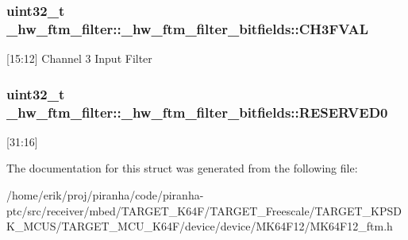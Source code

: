 \subsubsection[{\texorpdfstring{C\+H3\+F\+V\+AL}{CH3FVAL}}]{\setlength{\rightskip}{0pt plus 5cm}uint32\+\_\+t \+\_\+hw\+\_\+ftm\+\_\+filter\+::\+\_\+hw\+\_\+ftm\+\_\+filter\+\_\+bitfields\+::\+C\+H3\+F\+V\+AL}\hypertarget{struct__hw__ftm__filter_1_1__hw__ftm__filter__bitfields_a79fa7480881c915bbac33194cc05620d}{}\label{struct__hw__ftm__filter_1_1__hw__ftm__filter__bitfields_a79fa7480881c915bbac33194cc05620d}
\mbox{[}15\+:12\mbox{]} Channel 3 Input Filter 
\subsubsection[{\texorpdfstring{R\+E\+S\+E\+R\+V\+E\+D0}{RESERVED0}}]{\setlength{\rightskip}{0pt plus 5cm}uint32\+\_\+t \+\_\+hw\+\_\+ftm\+\_\+filter\+::\+\_\+hw\+\_\+ftm\+\_\+filter\+\_\+bitfields\+::\+R\+E\+S\+E\+R\+V\+E\+D0}\hypertarget{struct__hw__ftm__filter_1_1__hw__ftm__filter__bitfields_a7301508d7bc934b91346f6df87dd9da0}{}\label{struct__hw__ftm__filter_1_1__hw__ftm__filter__bitfields_a7301508d7bc934b91346f6df87dd9da0}
\mbox{[}31\+:16\mbox{]} 

The documentation for this struct was generated from the following file\+:\begin{DoxyCompactItemize}
\item 
/home/erik/proj/piranha/code/piranha-\/ptc/src/receiver/mbed/\+T\+A\+R\+G\+E\+T\+\_\+\+K64\+F/\+T\+A\+R\+G\+E\+T\+\_\+\+Freescale/\+T\+A\+R\+G\+E\+T\+\_\+\+K\+P\+S\+D\+K\+\_\+\+M\+C\+U\+S/\+T\+A\+R\+G\+E\+T\+\_\+\+M\+C\+U\+\_\+\+K64\+F/device/device/\+M\+K64\+F12/M\+K64\+F12\+\_\+ftm.\+h\end{DoxyCompactItemize}
